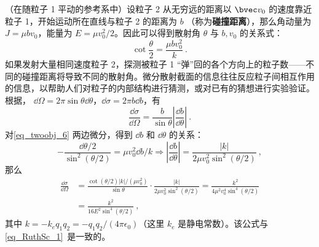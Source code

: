 （在随粒子 1 平动的参考系中）设粒子 2 从无穷远的距离以 $\bvec v_0$ 的速度靠近粒子 1，开始运动所在直线与粒子 2 的距离为 $b$ （称为\textbf{碰撞距离}），那么角动量为 $J=\mu bv_0$，能量为 $E=\mu v_0^2/2$。因此可以得到散射角 $\theta$ 与 $b,v_0$ 的关系式：
\begin{equation}\label{eq_twoobj_6}
\cot \frac{\theta}{2}=\frac{\mu bv_0^2}{k}~.
\end{equation}
如果发射大量相同速度粒子 2，探测被粒子 1 “弹”回的各个方向上的粒子数——不同的碰撞距离将导致不同的散射角。微分散射截面的信息往往反应粒子间相互作用的信息，以帮助人们对粒子的内部结构进行猜测，或对已有的猜想进行实验验证。根据， $\dd \Omega=2\pi \sin\theta \dd \theta$，$\dd \sigma=2\pi b\dd b$，有
\begin{equation}
\frac{\dd \sigma}{\dd \Omega}=\frac{b}{\sin \theta}\left|\frac{\dd b}{\dd \theta}\right|~.
\end{equation}
对\autoref{eq_twoobj_6} 两边微分，得到 $\dd b$ 和 $\dd \theta$ 的关系：
\begin{equation}
-\frac{\dd \theta/2}{\sin^2(\theta/2)}=\mu v_0^2\dd b/k\Rightarrow \left|\frac{\dd b}{\dd \theta}\right|=\frac{|k|}{2\mu v_0^2\sin^2(\theta/2)}~,
\end{equation}
那么
\begin{equation}
\begin{aligned}
\frac{\dd \sigma}{\dd \Omega}&=\frac{\cot(\theta/2)|k|/(\mu v_0^2)}{\sin\theta}\cdot \frac{|k|}{2\mu v_0^2\sin^2(\theta/2)}=\frac{k^2}{4\mu ^2v_0^4\sin^4(\theta/2)}
\\
&=\frac{k^2}{16E^2\sin^4(\theta/2)}~,
\end{aligned}
\end{equation}
其中 $k=-k_eq_1q_2=-q_1q_2/(4\pi\epsilon_0)$（这里 $k_e$ 是静电常数）。该公式与\autoref{eq_RuthSc_1}~是一致的。
